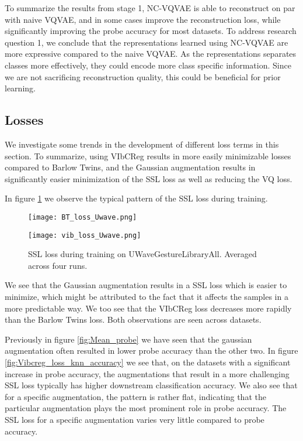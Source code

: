 \documentclass[../../thesis.tex]{subfiles}
\begin{document}
To summarize the results from stage 1,  NC-VQVAE is able to reconstruct on par with naive VQVAE, and in some cases improve the reconstruction loss, while significantly improving the probe accuracy for most datasets. To address research question 1, we conclude that the representations learned using NC-VQVAE are more expressive compared to the naive VQVAE. As the representations separates classes more effectively, they could encode more class specific information. Since we are not sacrificing reconstruction quality, this could be beneficial for prior learning.

\subsection{Losses}

We investigate some trends in the development of different loss terms in this section. To summarize, using VIbCReg results in more easily minimizable losses compared to Barlow Twins, and the Gaussian augmentation results in significantly easier minimization of the SSL loss as well as reducing the VQ loss. \newline

In figure \ref{fig:SSL_loss_UWave} we observe the typical pattern of the SSL loss during training. 
\begin{figure}[h]
    \centering
    \begin{minipage}[b]{0.49\textwidth}
        \centering
        \texttt{[image: BT\_loss\_Uwave.png]}
    \end{minipage}
    \hfill
    \begin{minipage}[b]{0.49\textwidth}
        \centering
        \texttt{[image: vib\_loss\_Uwave.png]}
    \end{minipage}
    \caption{SSL loss during training on UWaveGestureLibraryAll. Averaged across four runs.}
    \label{fig:SSL_loss_UWave}
\end{figure}

We see that the Gaussian augmentation results in a SSL loss which is easier to minimize, which might be attributed to the fact that it affects the samples in a more predictable way. We too see that the VIbCReg loss decreases more rapidly than the Barlow Twins loss. Both observations are seen across datasets. \newline

Previously in figure \ref{fig:Mean_probe} we have seen that the gaussian augmentation often resulted in lower probe accuracy than the other two. In figure \ref{fig:Vibcreg_loss_knn_accuracy} we see that, on the datasets with a significant increase in probe accuracy, the augmentations that result in a more challenging SSL loss typically has higher downstream classification accuracy. We also see that for a specific augmentation, the pattern is rather flat, indicating that the particular augmentation plays the most prominent role in probe accuracy. The SSL loss for a specific augmentation varies very little compared to probe accuracy. \newline
\end{document}
